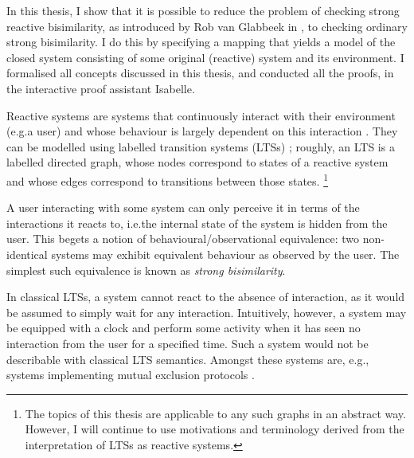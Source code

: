 %
\begin{isabellebody}%
%
%
\isadelimtheory
%
\endisadelimtheory
%
\isatagtheory
%
\endisatagtheory
{\isafoldtheory}%
%
\isadelimtheory
%
\endisadelimtheory
%
\isadelimdocument
%
\endisadelimdocument
%
\isatagdocument
%
\isamarkuptrue%
%
\endisatagdocument
{\isafolddocument}%
%
\isadelimdocument
%
\endisadelimdocument
%
\begin{isamarkuptext}%
\label{chap:introduction}%
\end{isamarkuptext}\isamarkuptrue%
%
\begin{isamarkuptext}%
In this thesis, I show that it is possible to reduce the problem of checking strong reactive bisimilarity, as introduced by Rob van Glabbeek in \cite{rbs}, to checking ordinary strong bisimilarity. I do this by specifying a mapping that yields a model of the closed system consisting of some original (reactive) system and its environment. 
I formalised all concepts discussed in this thesis, and conducted all the proofs, in the interactive proof assistant Isabelle.

Reactive systems are systems that continuously interact with their envi\-ronment (e.g.\@ a user) and whose behaviour is largely dependent on this interaction \cite{harel85}.
They can be modelled using labelled transition systems (LTSs) \cite{keller76}; roughly, an LTS is a labelled directed graph, whose nodes correspond to states of a reactive system and whose edges correspond to transitions between those states.%
\footnote{The topics of this thesis are applicable to any such graphs in an abstract way. However, I will continue to use motivations and terminology derived from the interpretation of LTSs as reactive systems.}

A user interacting with some system can only perceive it in terms of the interactions it reacts to, i.e.\@ the internal state of the system is hidden from the user. This begets a notion of behavioural/observational equivalence: two non-identical systems may exhibit equivalent behaviour as observed by the user. The simplest such equivalence is known as \emph{strong bisimilarity}.

In classical LTSs, a system cannot react to the absence of interaction, as it would be assumed to simply wait for any interaction. Intuitively, however, a system may be equipped with a clock and perform some activity when it has seen no interaction from the user for a specified time. Such a system would not be describable with classical LTS semantics. Amongst these systems are, e.g., systems implementing mutual exclusion protocols \cite{rbs}.


\end{isamarkuptext}
\end{isabellebody}
